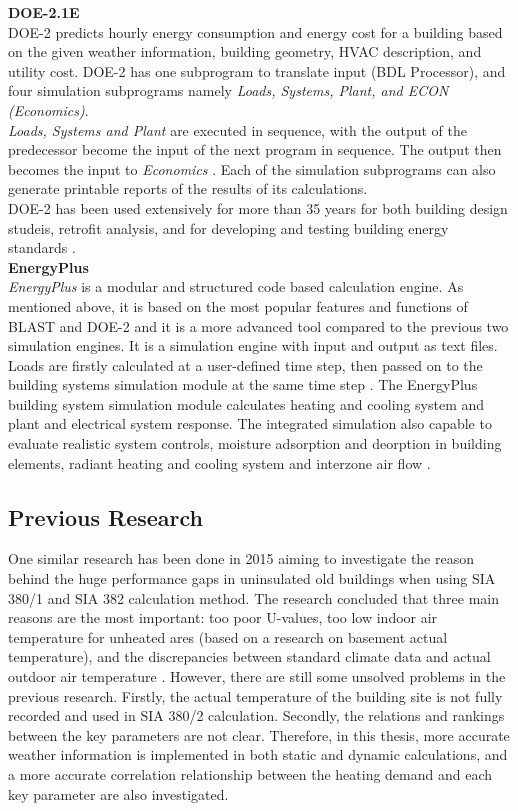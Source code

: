 \documentclass[11pt, a4paper]{article}
\theoremstyle{definition}
\begin{document}
		\textbf{DOE-2.1E}\\
			DOE-2 predicts hourly energy consumption and energy cost for a building based on the given weather information, building geometry, HVAC description, and utility cost. DOE-2 has one subprogram to translate input (BDL Processor), and four simulation subprograms namely \textit{Loads, Systems, Plant, and ECON (Economics)}.\\
			\textit{Loads, Systems and Plant} are executed in sequence, with the output of the predecessor become the input of the next program in sequence. The output then becomes the input to \textit{Economics} \cite{crawley2008contrasting}. Each of the simulation subprograms can also generate printable reports of the results of its calculations.\\
			DOE-2 has been used extensively for more than 35 years for both building design studeis, retrofit analysis, and for developing and testing building energy standards \cite{crawley2008contrasting}.\\
		

		\textbf{EnergyPlus}\\
			\textit{EnergyPlus} is a modular and structured code based calculation engine. As mentioned above, it is based on the most popular features and functions of BLAST and DOE-2 and it is a more advanced tool compared to the previous two simulation engines. It is a simulation engine with input and output as text files. Loads are firstly calculated at a user-defined time step, then passed on to the building systems simulation module at the same time step \cite{crawley2008contrasting}. The EnergyPlus building system simulation module calculates heating and cooling system and plant and electrical system response. The integrated simulation also capable to evaluate realistic system controls, moisture adsorption and deorption in building elements, radiant heating and cooling system and interzone air flow \cite{crawley2008contrasting}.\\


		

	\subsection{Previous Research}
		 One similar research has been done in 2015 aiming to investigate the reason behind the huge performance gaps in uninsulated old buildings when using SIA 380/1 and SIA 382 calculation method. The research concluded that three main reasons are the most important: too poor U-values, too low indoor air temperature for unheated ares (based on a research on basement actual temperature), and the discrepancies between standard climate data and actual outdoor air temperature \cite{SIAPreviousreport}. However, there are still some unsolved problems in the previous research. Firstly, the actual temperature of the building site is not fully recorded and used in SIA 380/2 calculation. Secondly, the relations and rankings between the key parameters are not clear. Therefore, in this thesis, more accurate weather information is implemented in both static and dynamic calculations, and a more accurate correlation relationship between the heating demand and each key parameter are also investigated.
\end{document}

